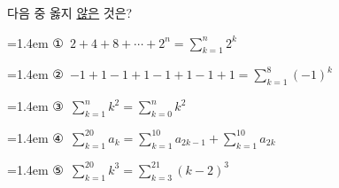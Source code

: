 다음 중 옳지 \underline{않은} 것은?
\par\medskip\par\noindent\hangindent=1.4em {\small ①}\ $2+4+8+\cdots+2^n=\displaystyle\sum_{k=1}^{n} 2^k$\par\noindent\hangindent=1.4em {\small ②}\ $-1+1-1+1-1+1-1+1=\displaystyle\sum_{k=1}^{8} (-1)^k$\par\noindent\hangindent=1.4em {\small ③}\ $\displaystyle\sum_{k=1}^{n} k^2=\sum_{k=0}^{n} k^2$\par\noindent\hangindent=1.4em {\small ④}\ $\displaystyle\sum_{k=1}^{20} a_k=\sum_{k=1}^{10} a_{2k-1}+\sum_{k=1}^{10} a_{2k}$\par\noindent\hangindent=1.4em {\small ⑤}\ $\displaystyle\sum_{k=1}^{20} k^3=\sum_{k=3}^{21} (k-2)^3$\par\medskip
